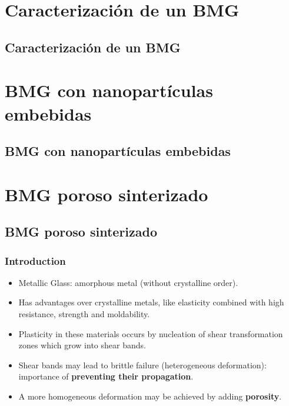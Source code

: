 \documentclass[12pt,t]{beamer}
\begin{document}

\section[Caracterizaci\'on]{Caracterizaci\'on de un BMG}
\subsection{Caracterizaci\'on de un BMG}

\begin{frame}
 
\end{frame}



\section[BMG con nanopart\'iculas]{BMG con nanopart\'iculas embebidas}
\subsection{BMG con nanopart\'iculas embebidas}

\begin{frame}
 
\end{frame}


\section[BMG poroso]{BMG poroso sinterizado}
\subsection{BMG poroso sinterizado}

\begin{frame}
    \frametitle{Introduction}
    \vspace{0.2cm}
    \begin{itemize}
        \item Metallic Glass: amorphous metal (without crystalline order).
        \item Has advantages over crystalline metals, like elasticity combined with high resistance, strength and moldability.
        \item Plasticity in these materials occurs by nucleation of shear transformation zones which grow into shear bands.
        \item Shear bands may lead to brittle failure (heterogeneous deformation): importance of \textbf{preventing their propagation}.
        \item A more homogeneous deformation may be achieved by adding \textbf{porosity}.
    \end{itemize} 
\end{frame}
\end{document}
